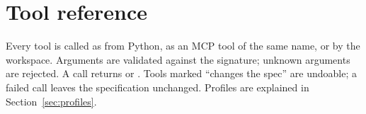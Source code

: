 \chapter{Tool reference}\label{app:tools}

Every tool is called as  from Python, as an MCP tool of the same name, or by the
workspace. Arguments are validated against the signature; unknown arguments are rejected. A call returns
 or . Tools
marked ``changes the spec'' are undoable; a failed call leaves the specification unchanged. Profiles are explained in
Section~\ref{sec:profiles}.


